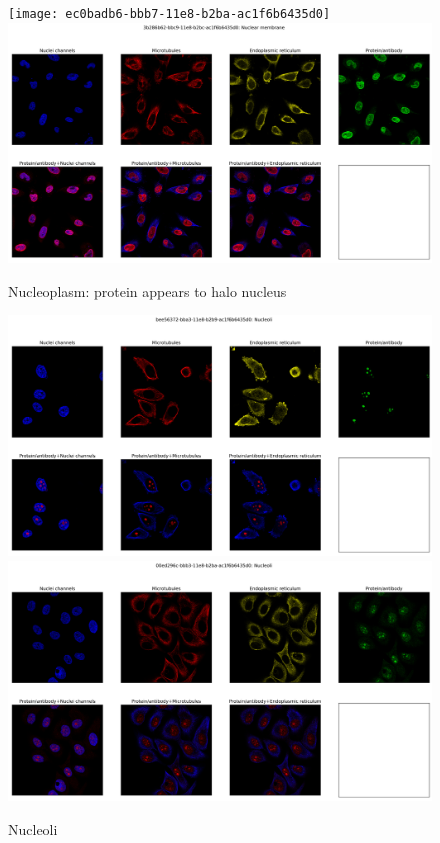 \documentclass[]{article}
\begin{document}
\begin{figure}
	\caption[Nuclear Membrane: protein appears to halo nucleus]{Nucleoplasm: protein appears to halo nucleus}
	\texttt{[image: ec0badb6-bbb7-11e8-b2ba-ac1f6b6435d0]}
	\includegraphics[width=\textwidth]{3b286b62-bbc9-11e8-b2bc-ac1f6b6435d0}
\end{figure}

\begin{figure}
	\caption{Nucleoli}
	\includegraphics[width=\textwidth]{bee56372-bba3-11e8-b2b9-ac1f6b6435d0}
	\includegraphics[width=\textwidth]{00ed296c-bbb3-11e8-b2ba-ac1f6b6435d0}
\end{figure}
\end{document}
